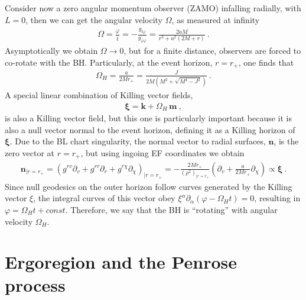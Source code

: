 Consider now a zero angular momentum observer (ZAMO) infalling radially, with $L=0$, then we can get the angular velocity $\Omega$, as measured at infinity
\begin{align}
    \Omega = \frac{\dot{\varphi}}{\dot{t}} = - \frac{g_{t\varphi}}{g_{\varphi\varphi}} = \frac{2 a M}{r^3 + a^2 (2 M+r)} ~.
    \label{eq2:angMomentumZAMO}
\end{align}
Asymptotically we obtain $\Omega\to0$, but for a finite distance, observers are forced to co-rotate with the BH. 
Particularly, at the event horizon, $r=r_+$, one finds that
\begin{align}
    \Omega_H = \frac{a}{2 M r_+} = \frac{J}{2 M \left(M^2+\sqrt{M^4-J^2}\right)} ~.
    \label{eq2:angMomentumH}
\end{align}
A special linear combination of Killing vector fields,
\begin{align}
    \bm{\xi} = \bm{k} + \Omega_H \,\bm{m} ~,
    \label{eq2:KillingXi}
\end{align}
is also a Killing vector field, but this one is particularly important because it is also a null vector normal to the event horizon, defining it as a Killing horizon of $\bm{\xi}$.
Due to the BL chart singularity, the normal vector to radial surfaces, $\bm{n}$, is the zero vector at $r=r_{+}$, but using ingoing EF coordinates we obtain
\begin{align}
    \bm{n}_{|r=r_{+}} = \left( g^{rv} \partial_v + g^{rr} \partial_r + g^{r\chi} \partial_\chi \right)_{|r=r_{+}} = - \frac{2 M r_+}{(\rho^2)_{|r=r_+}} \left( \partial_v + \frac{a}{2 M r_+} \partial_\chi \right) \propto \bm{\xi} ~.
\end{align}
Since null geodesics on the outer horizon follow curves generated by the Killing vector $\xi$, the integral curves of this vector obey $\xi^\alpha \partial_\alpha (\varphi - \Omega_H t) = 0$, resulting in $\varphi = \Omega_H t + const$.
Therefore, we say that the BH is ``rotating'' with angular velocity $\Omega_H$.


\section{Ergoregion and the Penrose process}

